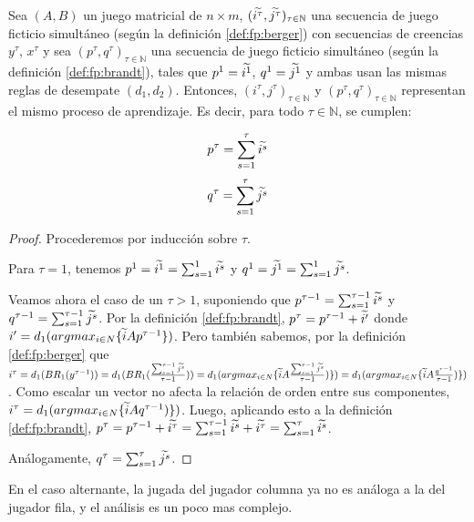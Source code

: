 \begin{lemma} \label{lema:equiv:sim}
    Sea $(A, B)$ un juego matricial de $n \times m$, $(\widetilde{i^\tau}, \widetilde{j^\tau})_{\tau \in \mathbb{N}}$ una secuencia de juego ficticio simultáneo (según la definición \ref{def:fp:berger}) con secuencias de creencias $y^\tau$, $x^\tau$ y sea $(p^\tau, q^\tau)_{\tau \in \mathbb{N}}$ una secuencia de juego ficticio simultáneo (según la definición \ref{def:fp:brandt}), tales que $p^1 = \widetilde{i^1}$, $q^1 = \widetilde{j^1}$ y ambas usan las mismas reglas de desempate $(d_1, d_2)$. Entonces, $(i^\tau, j^\tau)_{\tau \in \mathbb{N}}$ y $(p^\tau, q^\tau)_{\tau \in \mathbb{N}}$ representan el mismo proceso de aprendizaje. Es decir, para todo $\tau \in \mathbb{N}$, se cumplen:

    \[ p^{\tau} = \sum_{s=1}^\tau{\widetilde{i^s}} \]
    \[ q^{\tau} = \sum_{s=1}^\tau{\widetilde{j^s}} \]

\end{lemma}
\begin{proof}
    Procederemos por inducción sobre $\tau$.

    Para $\tau = 1$, tenemos $p^1 = \widetilde{i^1} = \sum_{s=1}^1{\widetilde{i^s}}$ y $q^1 = \widetilde{j^1} = \sum_{s=1}^1{\widetilde{j^s}}$.

    Veamos ahora el caso de un $\tau > 1$, suponiendo que $p^{\tau-1} = \sum_{s=1}^{\tau-1}{\widetilde{i^s}}$ y $q^{\tau-1} = \sum_{s=1}^{\tau-1}{\widetilde{j^s}}$.
    Por la definición \ref{def:fp:brandt}, $p^\tau = p^{\tau-1} + \widetilde{i'}$ donde $i' = d_1(argmax_{i \in N}\{\widetilde{i}Ap^{\tau-1}\})$.
    Pero también sabemos, por la definición \ref{def:fp:berger}
    que $i^\tau = d_1(BR_1(y^{\tau-1})) = d_1(BR_1(\frac{\sum_{s=1}^{\tau-1} \widetilde{j^s}}{\tau-1})) = d_1(argmax_{i \in N}\{\widetilde{i} A\frac{\sum_{s=1}^{\tau-1} \widetilde{j^s}}{\tau-1})\}) = d_1(argmax_{i \in N}\{\widetilde{i} A\frac{q^{\tau-1}}{\tau-1})\})$.
    Como escalar un vector no afecta la relación de orden entre sus componentes, $i^\tau = d_1(argmax_{i \in N}\{\widetilde{i} Aq^{\tau-1})\})$.
    Luego, aplicando esto a la definición \ref{def:fp:brandt}, $p^\tau = p^{\tau-1} + \widetilde{i^\tau} = \sum_{s=1}^{\tau-1}{\widetilde{i^s}} + \widetilde{i^\tau} = \sum_{s=1}^{\tau}{\widetilde{i^s}}$.
    
    Análogamente, $q^{\tau} = \sum_{s=1}^\tau{\widetilde{j^s}}$.
\end{proof}


En el caso alternante, la jugada del jugador columna ya no es análoga a la del jugador fila, y el análisis es un poco mas complejo.


